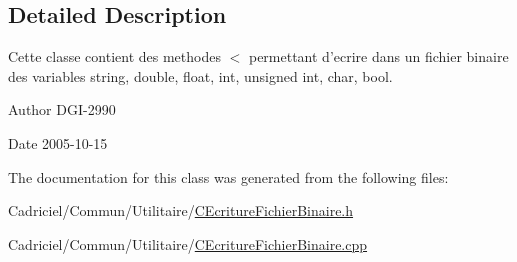 \subsection{Detailed Description}
Cette classe contient des methodes $<$ permettant d'ecrire dans un fichier binaire des variables string, double, float, int, unsigned int, char, bool. 

\begin{DoxyAuthor}{Author}
D\-G\-I-\/2990 
\end{DoxyAuthor}
\begin{DoxyDate}{Date}
2005-\/10-\/15 
\end{DoxyDate}


The documentation for this class was generated from the following files\-:\begin{DoxyCompactItemize}
\item 
Cadriciel/\-Commun/\-Utilitaire/\hyperlink{_c_ecriture_fichier_binaire_8h}{C\-Ecriture\-Fichier\-Binaire.\-h}\item 
Cadriciel/\-Commun/\-Utilitaire/\hyperlink{_c_ecriture_fichier_binaire_8cpp}{C\-Ecriture\-Fichier\-Binaire.\-cpp}\end{DoxyCompactItemize}
